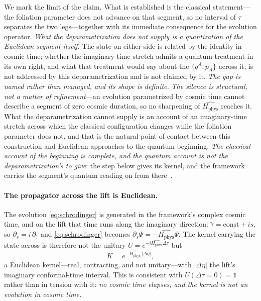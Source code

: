 \documentclass[11pt,a4paper]{article}
\theoremstyle{plain}
\theoremstyle{definition}
\theoremstyle{remark}
\newcommand{\Hphys}{H_{\mathrm{phys}}}
\begin{document}
We mark the limit of the claim. What is established is the classical statement---the foliation parameter does
not advance on that segment, so no interval of $\tau$ separates the two legs---together with its immediate
consequence for the evolution operator. \emph{What the deparametrization does not supply is a quantization of the Euclidean
segment itself.} The state on either side is related by the identity in cosmic time; whether the imaginary-time
stretch admits a quantum treatment in its own right, and what that treatment would say about the
$\{q^A,p_A\}$ across it, is not addressed by this deparametrization and is not claimed by it. \emph{The gap is named rather than managed, and its shape is definite.} \emph{The silence is structural, not a matter of refinement}---an evolution parametrized by cosmic time cannot describe a segment of zero cosmic duration, so no sharpening of $\hat{\Hphys}$ reaches it. What the deparametrization cannot supply is an account of an imaginary-time stretch across which the classical configuration changes while the foliation parameter does not, and that is the natural point of contact between this construction and Euclidean approaches to the quantum beginning. \emph{The classical account of the beginning is complete, and the quantum account is not the deparametrization's to give}: the step below gives its kernel, and the framework carries the segment's quantum reading on from there~\cite{JanzenCRframework}.

\paragraph{The propagator across the lift is Euclidean.} The evolution \eqref{eq:schrodinger} is generated in
the framework's complex cosmic time, and on the lift that time runs along the imaginary direction:
$\tilde\tau=\mathrm{const}+is$, so $\partial_s=i\,\partial_{\tilde\tau}$ and \eqref{eq:schrodinger} becomes
$\partial_s\Psi=-\hat{\Hphys}\Psi$. The kernel carrying the state across is therefore not the unitary
$U=e^{-i\hat{\Hphys}\Delta\tau}$ but
\begin{equation}
K=e^{-\hat{\Hphys}\,\lvert\Delta\eta\rvert},
\label{eq:euclidean-kernel}
\end{equation}
a Euclidean kernel---real, contracting, and not unitary---with $\lvert\Delta\eta\rvert$ the lift's imaginary
conformal-time interval. This is consistent with $U(\Delta\tau=0)=\mathbb{1}$ rather than in tension with it:
\emph{no cosmic time elapses, and the kernel is not an evolution in cosmic time.}
\end{document}
